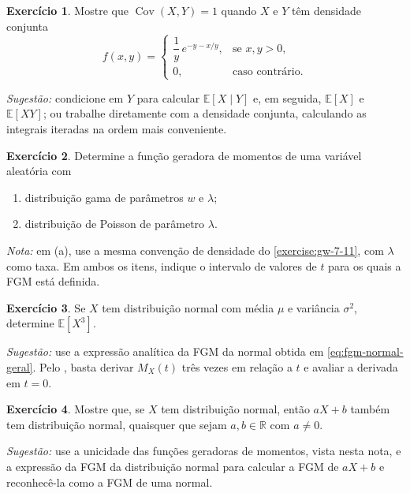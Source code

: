 \documentclass[12pt,portuguese]{article}
\theoremstyle{definition}
\theoremstyle{plainexercise}
\newtheorem{exercise}{Exercício}
\theoremstyle{starredexercise}
\newtheorem{starredexercise}[exercise]{Exercício}
\theoremstyle{definition}
\begin{document}
\begin{starredexercise}\label{exercise:gw-7-37}
  Mostre que $\operatorname{Cov}(X,Y) = 1$ quando $X$ e $Y$ têm densidade
  conjunta
  \[
    f(x,y) =
    \begin{cases}
      \dfrac{1}{y}\,e^{-y-x/y}, & \text{se } x, y > 0, \\[0.3cm]
      0, & \text{caso contrário}.
    \end{cases}
  \]

  \noindent\emph{Sugestão:} condicione em $Y$ para calcular $\mathbb{E}[X\mid Y]$ e,
  em seguida, $\mathbb{E}[X]$ e $\mathbb{E}[XY]$; ou trabalhe diretamente com a densidade conjunta,
  calculando as integrais iteradas na ordem mais conveniente.
\end{starredexercise}


\begin{exercise}\label{exercise:gw-7-59}
  Determine a função geradora de momentos de uma variável aleatória com
  \begin{enumerate}[label=(\alph*)]
    \item distribuição gama de parâmetros $w$ e $\lambda$;
    \item distribuição de Poisson de parâmetro $\lambda$.
  \end{enumerate}

  \noindent\emph{Nota:} em (a), use a mesma convenção de densidade do
  \cref{exercise:gw-7-11}, com $\lambda$ como taxa. Em ambos os itens, indique o
  intervalo de valores de $t$ para os quais a FGM está definida.
\end{exercise}

\begin{exercise}\label{exercise:gw-7-60}
  Se $X$ tem distribuição normal com média $\mu$ e variância $\sigma^2$,
  determine $\mathbb{E}[X^3]$.

  \noindent\emph{Sugestão:} use a expressão analítica da FGM da normal obtida em \eqref{eq:fgm-normal-geral}.
  Pelo , basta derivar $M_X(t)$ três vezes em relação a $t$ e
  avaliar a derivada em $t=0$.
\end{exercise}

\begin{exercise}\label{exercise:gw-7-61}
  Mostre que, se $X$ tem distribuição normal, então $aX+b$ também tem
  distribuição normal, quaisquer que sejam $a,b\in\mathbb{R}$ com $a\neq 0$.

  \noindent\emph{Sugestão:} use a unicidade das funções geradoras de momentos, vista
  nesta nota, e a expressão da FGM da distribuição normal para calcular a FGM
  de $aX+b$ e reconhecê-la como a FGM de uma normal.
\end{exercise}
\end{document}
